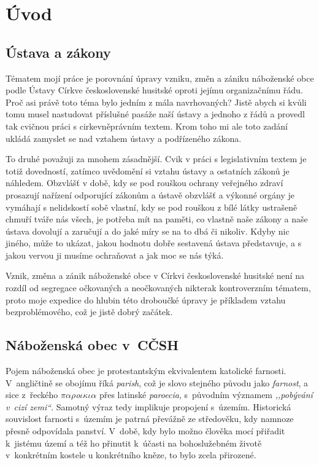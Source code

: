 \chapter{Úvod}
\label{kap:uvod}

\section{Ústava a zákony}

Tématem mojí práce je porovnání úpravy vzniku, změn a zániku náboženské obce
podle Ústavy Církve československé husitské oproti jejímu organizačnímu řádu. Proč asi
právě toto téma bylo jedním z mála navrhovaných? Jistě abych si kvůli tomu musel
nastudovat příslušné pasáže naší ústavy a jednoho z řádů a provedl tak cvičnou
práci s cirkevněprávním textem. Krom toho mi ale toto zadání ukládá zamyslet se
nad vztahem ústavy a podřízeného zákona.

To druhé považuji za mnohem zásadnější. Cvik v práci s legislativním textem je
totiž dovedností, zatímco uvědomění si vztahu ústavy a ostatních zákonů je
náhledem. Obzvlášť v době, kdy se pod rouškou ochrany veřejného zdraví prosazují
nařízení odporující zákonům a ústavě obzvlášť a výkonné orgány je vymáhají s
nelidskostí sobě vlastní, kdy se pod rouškou z bílé látky ustrašeně chmuří tváře
nás všech, je potřeba mít na paměti, co vlastně naše zákony a naše ústava
dovolují a zaručují a do jaké míry se na to dbá či nikoliv. Kdyby nic jiného,
může to ukázat, jakou hodnotu dobře sestavená ústava představuje, a s jakou
vervou ji musíme ochraňovat a jak moc se nás týká.

Vznik, změna a zánik náboženské obce v Církvi československé husitské není na
rozdíl od segregace očkovaných a neočkovaných nikterak kontroverzním tématem,
proto moje expedice do hlubin této droboučké úpravy je příkladem vztahu
bezproblémového, což je jistě dobrý začátek.

\section{Náboženská obec v~CČSH}

Pojem náboženská obec je protestantským ekvivalentem katolické farnosti.
V~angličtině se obojímu říká \textit{parish}, což je slovo stejného původu jako
\textit{farnost}, a sice z~řeckého {$\pi\alpha\rho$\textit{o}$\iota\kappa\iota\alpha$} přes latinské
\textit{paroecia}, s~původním významem \textit{,,pobývání v~cizí zemi``}.
Samotný výraz tedy implikuje propojení s~územím.
Historická souvislost farnosti s~územím je patrná převážně ze středověku, kdy
namnoze přesně odpovídala panství.
V~době, kdy bylo možno
člověka mocí přiřadit k~jistému území a též ho přinutit k~účasti na
bohoslužebném životě v~konkrétním kostele u konkrétního kněze, to bylo zcela
přirozené.

